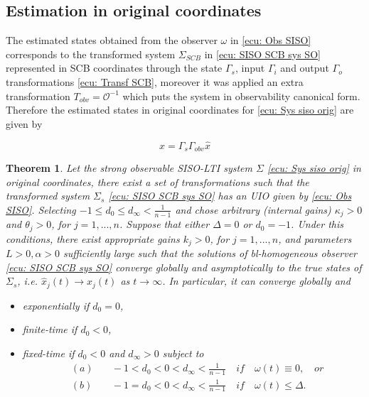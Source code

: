 \documentclass[11pt,letterpaper,twoside,openright]{report}
\newtheorem{theorem}{Theorem}[chapter]
\begin{document}
\subsection{Estimation in original coordinates}
The estimated states obtained from the observer $\omega$ in \eqref{ecu: Obs SISO} corresponds to the transformed system $\Sigma_{SCB}$ in \eqref{ecu: SISO SCB sys SO} represented in SCB coordinates through the state $\Gamma_s$, input $\Gamma_i$ and output $\Gamma_o$ transformations \eqref{ecu: Transf SCB}, moreover it was applied an extra transformation $T_{obv}=\mathcal{O}^{-1}$ which puts the system in observability canonical form. Therefore the estimated states in original coordinates for \eqref{ecu: Sys siso orig} are given by

\begin{equation}
	x = \Gamma_s\Gamma_{obv}\hat{x}
\end{equation}

\begin{theorem}\label{theo: Obsv SISO}
	Let the strong observable SISO-LTI system $\Sigma$ \eqref{ecu: Sys siso orig} in original coordinates, there exist a set of transformations such that the transformed system $\Sigma_s$ \eqref{ecu: SISO SCB sys SO} has an UIO given by \eqref{ecu: Obs SISO}. Selecting $-1\leq d_0\leq d_{\infty}<\frac{1}{n-1}$ and chose arbitrary (internal gains)  $\kappa_j>0$ and $\theta_j>0$, for $j=1,...,n$. Suppose that either $\Delta=0$ or $d_0=-1$. Under this conditions,  there exist appropriate gains $k_j>0$, for $j=1,...,n$, and parameters $L>0,\alpha>0$ sufficiently large such that the solutions of bl-homogeneous observer \eqref{ecu: SISO SCB sys SO} converge globally and asymptotically to the true states of $\Sigma_s$, i.e. $\hat{x}_j(t) \rightarrow x_j(t)$ as $t \rightarrow \infty$. In particular, it can converge globally and %
	\begin{itemize}
		\item exponentially if $d_0=0$,
		\item finite-time if  $d_0 < 0$,
		\item fixed-time if $d_0<0$ and $d_{\infty}>0$ subject to
		\begin{eqnarray*}
			&(a)& \quad -1 < d_0 < 0 < d_\infty < \frac{1}{n-1} \quad if \quad \omega(t) \equiv 0,  \quad or \\
			&(b)& \quad -1 = d_0 < 0 < d_\infty < \frac{1}{n-1} \quad if \quad \omega(t) \leq \Delta.
		\end{eqnarray*}
	\end{itemize}
\end{theorem}
\end{document}
